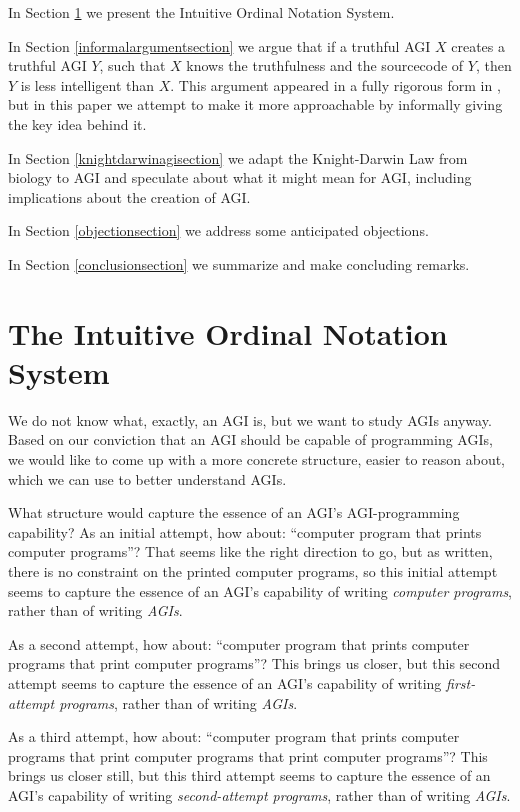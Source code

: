 \documentclass[runningheads]{llncs}
\begin{document}
In Section \ref{notationsystemsection} we present the Intuitive Ordinal Notation
System.

In Section \ref{informalargumentsection} we argue that if a truthful AGI $X$ creates
a truthful AGI $Y$, such that $X$
knows the truthfulness and the sourcecode of $Y$, then $Y$ is less intelligent
than $X$. This argument appeared in a fully rigorous form in \cite{alexander2019measuring},
but in this paper we attempt to make it more approachable by informally giving
the key idea behind it.

In Section \ref{knightdarwinagisection} we adapt the Knight-Darwin Law from biology to AGI
and speculate about what it might mean for AGI, including implications about
the creation of AGI.

In Section \ref{objectionsection} we address some anticipated objections.

In Section \ref{conclusionsection} we summarize and make concluding remarks.


\section{The Intuitive Ordinal Notation System}
\label{notationsystemsection}

We do not know what, exactly, an AGI is, but we want to study AGIs anyway.
Based on our conviction that an AGI should be capable of programming AGIs,
we would like to come up with a more concrete structure, easier to reason
about, which we can use to better understand AGIs.

What structure would capture the essence of an AGI's AGI-programming
capability? As an initial attempt, how about: ``computer
program that prints computer programs''? That seems like the right direction
to go, but as written, there is no constraint on the printed computer programs, so
this initial attempt seems to capture the essence of an
AGI's capability of writing \emph{computer programs}, rather than of writing \emph{AGIs}.

As a second attempt, how
about: ``computer program that prints computer programs that print
computer programs''? This brings us closer, but this second attempt
seems to capture the essence of an AGI's capability of writing \emph{first-attempt programs},
rather than of writing \emph{AGIs}.

As a third attempt, how about:
``computer program that prints computer programs that print computer programs
that print computer programs''? This brings us closer still, but this third
attempt seems to capture the essence of an AGI's capability of writing
\emph{second-attempt programs}, rather than of
writing \emph{AGIs}.
\end{document}
